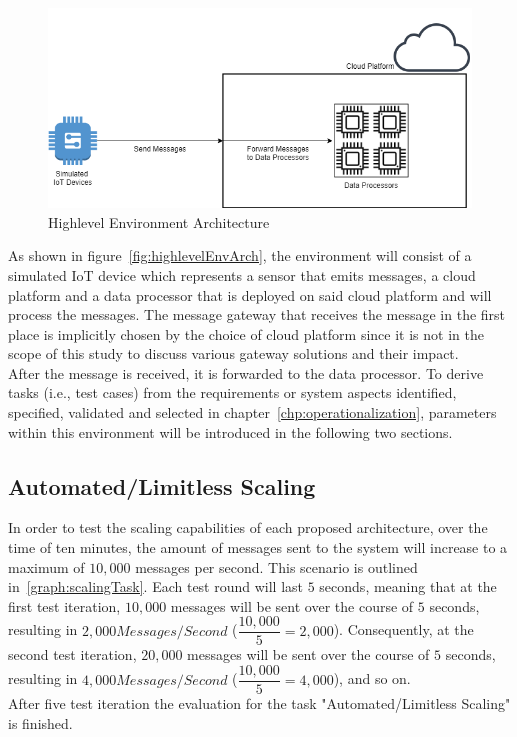 \begin{figure}[ht]
    \includegraphics[width=\linewidth]{images/drawio/highlevelTestArch.png}\centering
    \caption{Highlevel Environment Architecture}
    \label{fig:highlevelEnvArch}
\end{figure}

As shown in figure~\vref{fig:highlevelEnvArch}, the environment will consist of a simulated IoT device which represents a sensor that emits messages, a cloud platform and a data processor that is deployed on said cloud platform and will process the messages. The message gateway that receives the message in the first place is implicitly chosen by the choice of cloud platform since it is not in the scope of this study to discuss various gateway solutions and their impact.  \\
After the message is received, it is forwarded to the data processor. To derive tasks (i.e., test cases) from the requirements or system aspects identified, specified, validated and selected in chapter~\vref{chp:operationalization}, parameters within this environment will be introduced in the following two sections. 
    
\subsection{Automated/Limitless Scaling}\label{ssec:scaling}

In order to test the scaling capabilities of each proposed architecture, over the time of ten minutes, the amount of messages sent to the system will increase to a maximum of $10,000$ messages per second. This scenario is outlined in~\vref{graph:scalingTask}. Each test round will last $5$ seconds, meaning that at the first test iteration, $10,000$ messages will be sent over the course of $5$ seconds, resulting in $2,000Messages/Second$ ($\dfrac{10,000}{5}=2,000$). Consequently, at the second test iteration, $20,000$ messages will be sent over the course of $5$ seconds, resulting in $4,000Messages/Second$ ($\dfrac{10,000}{5}=4,000$), and so on.\\
After five test iteration the evaluation for the task "Automated/Limitless Scaling" is finished.

